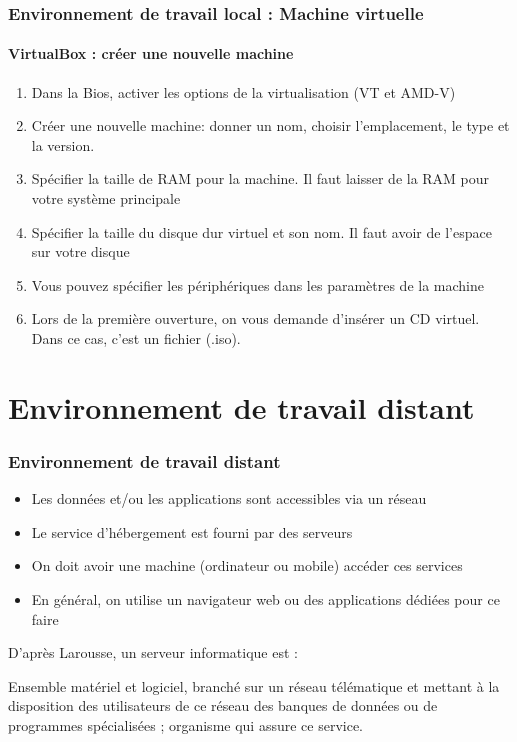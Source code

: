 \documentclass[xcolor=table]{beamer}
\begin{document}
\begin{frame}
\frametitle{Environnement de travail local : Machine virtuelle}
\framesubtitle{VirtualBox : créer une nouvelle machine}

\begin{enumerate}
	\item Dans la Bios, activer les options de la virtualisation (VT et AMD-V)
	\item Créer une nouvelle machine: donner un nom, choisir l'emplacement, le type et la version. 
	\item Spécifier la taille de RAM pour la machine. Il faut laisser de la RAM pour votre système principale 
	\item Spécifier la taille du disque dur virtuel et son nom. Il faut avoir de l'espace sur votre disque
	\item Vous pouvez spécifier les périphériques dans les paramètres de la machine 
	\item Lors de la première ouverture, on vous demande d'insérer un CD virtuel. Dans ce cas, c'est un fichier (.iso). 
\end{enumerate}

\end{frame}


\section{Environnement de travail distant}

\begin{frame}
\frametitle{Environnement de travail distant}

\begin{itemize}
	\item Les données et/ou les applications sont accessibles via un réseau
	\item Le service d'hébergement est fourni par des serveurs
	\item On doit avoir une machine (ordinateur ou mobile) accéder ces services
	\item En général, on utilise un navigateur web ou des applications dédiées pour ce faire
\end{itemize}

D'après Larousse, un serveur informatique est :
\begin{definition}
	Ensemble matériel et logiciel, branché sur un réseau télématique et mettant à la disposition des utilisateurs de ce réseau des banques de données ou de programmes spécialisées ; organisme qui assure ce service.
\end{definition}

\end{frame}
\end{document}
